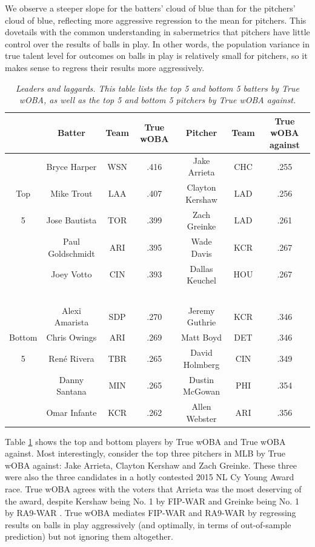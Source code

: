 \documentclass[11pt]{article}
\begin{document}
We observe a steeper slope for the batters'
cloud of blue than for the pitchers' cloud of blue, reflecting more aggressive
regression to the mean for pitchers. This dovetails with the common
understanding in sabermetrics that pitchers have little control over the
results of balls in play. In other words, the population variance in true
talent level for outcomes on balls in play is relatively small for pitchers, so
it makes sense to regress their results more aggressively.

\begin{table}[h]
\caption{\it Leaders and laggards. This table lists the top 5 and bottom 5
    batters by True wOBA, as well as the top 5 and bottom 5 pitchers by True
    wOBA against.}
\centering
\footnotesize
\begin{tabular}{cccc||ccc}
&Batter             &Team& True wOBA & Pitcher      &Team& True wOBA against\\
\hline
&Bryce Harper       &WSN & .416 & Jake Arrieta      &CHC & .255\\
Top&Mike Trout      &LAA & .407 & Clayton Kershaw   &LAD & .256\\
5&Jose Bautista     &TOR & .399 & Zach Greinke      &LAD & .261\\
&Paul Goldschmidt   &ARI & .395 & Wade Davis        &KCR & .267\\
&Joey Votto         &CIN & .393 & Dallas Keuchel    &HOU & .267\\
~\\
&Alexi Amarista     &SDP & .270 & Jeremy Guthrie    &KCR & .346\\
Bottom&Chris Owings &ARI & .269 & Matt Boyd         &DET & .346\\
5&Ren\'{e} Rivera   &TBR & .265 & David Holmberg    &CIN & .349\\
&Danny Santana      &MIN & .265 & Dustin McGowan    &PHI & .354\\
&Omar Infante       &KCR & .262 & Allen Webster     &ARI & .356
\end{tabular}
\label{tab-leaders}
\end{table}

Table \ref{tab-leaders} shows the top and bottom players by True wOBA and True
wOBA against. Most interestingly, consider the top three pitchers in MLB by
True wOBA against: Jake Arrieta, Clayton Kershaw and Zach Greinke. These three
were also the three candidates in a hotly contested 2015 NL Cy Young Award
race. True wOBA agrees with the voters that Arrieta was the most deserving of
the award, despite Kershaw being No. 1 by FIP-WAR and Greinke being No. 1 by
RA9-WAR \citep{FanGraphs}. True wOBA mediates FIP-WAR and RA9-WAR by regressing
results on balls in play aggressively (and optimally, in terms of out-of-sample
prediction) but not ignoring them altogether.
\end{document}
